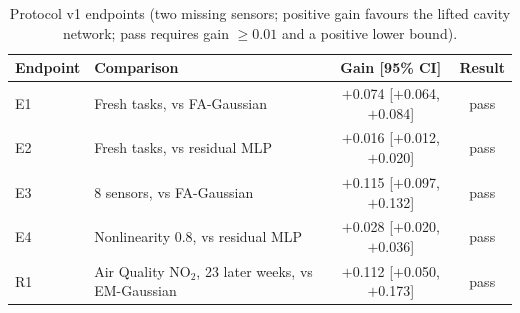 \begin{table}[h]
\centering\small
\caption{\label{tab:v1}Protocol v1 endpoints (two missing sensors; positive gain favours the lifted cavity network; pass requires gain $\geq0.01$ and a positive lower bound).}
\begin{tabular}{llcc}
\toprule
Endpoint & Comparison & Gain [95\% CI] & Result\\
\midrule
E1 & Fresh tasks, vs FA-Gaussian & $+$0.074 [$+$0.064, $+$0.084] & pass\\
E2 & Fresh tasks, vs residual MLP & $+$0.016 [$+$0.012, $+$0.020] & pass\\
E3 & 8 sensors, vs FA-Gaussian & $+$0.115 [$+$0.097, $+$0.132] & pass\\
E4 & Nonlinearity 0.8, vs residual MLP & $+$0.028 [$+$0.020, $+$0.036] & pass\\
R1 & Air Quality NO$_2$, 23 later weeks, vs EM-Gaussian & $+$0.112 [$+$0.050, $+$0.173] & pass\\
\bottomrule
\end{tabular}
\end{table}

